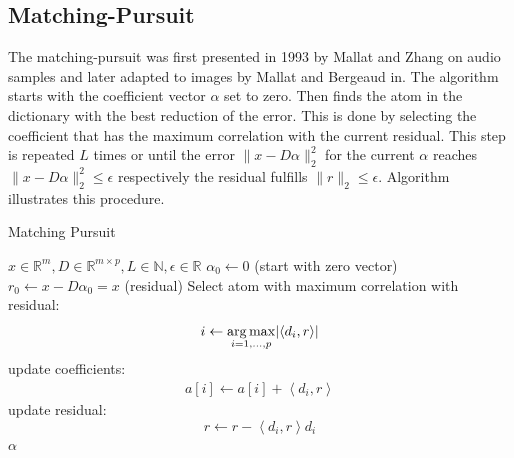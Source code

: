 \subsection{Matching-Pursuit}
\label{sec:mp}
The matching-pursuit was first presented in 1993 by Mallat and
Zhang\cite{Mallat1993} on audio samples and later adapted to images by Mallat
and Bergeaud in\cite{Mallat1995}.
The algorithm starts with the coefficient vector $\alpha$ set
to zero. Then finds the atom in the dictionary with the best reduction of the
error. This is done by selecting the coefficient that has the maximum
correlation with the current residual. This step is repeated $L$ times
or until the error $\lVert x - D\alpha \rVert^{2}_{2}$ for the current $\alpha$
reaches $\lVert x - D\alpha \rVert^{2}_{2} \leq \epsilon$ respectively the
residual fulfills $\lVert r \rVert_2 \leq \epsilon$.
Algorithm  illustrates this procedure.
\begin{algorithm}[H]
\caption{Matching Pursuit}
\label{alg:mp}
\begin{algorithmic}[1]
\REQUIRE $x \in \mathbb{R}^m, D \in \mathbb{R}^{m\times p}, L \in \mathbb{N},
\epsilon \in \mathbb{R}$
\STATE $\alpha_0 \gets 0$ (start with zero vector)
\STATE $r_0 \gets x-D\alpha_0 = x$ (residual) 
\STATE Select atom with maximum correlation with residual: 
\begin{equation*}
i \gets \operatorname*{arg\,max}_{i=1,...,p} \lvert \left<d_i,r\right> \rvert
\end{equation*}
\STATE update coefficients: 
\begin{align}
a[i]  \gets a[i] + \left<d_i,r\right> \label{eq:mp_update}
\end{align}
\STATE update residual:
\begin{equation*}
 r \gets r - \left<d_i,r\right>d_i
\end{equation*}
\ENDWHILE
\RETURN $\alpha$
\end{algorithmic}
\end{algorithm}

